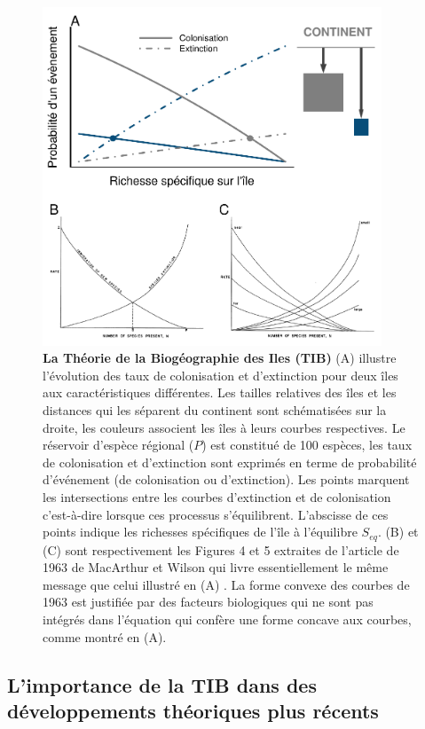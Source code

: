 \begin{figure}
\centering
\includegraphics[width=0.90000\textwidth]{fig/fig1.pdf}
\caption{\textbf{La Théorie de la Biogéographie des Iles (TIB)} (A)
illustre l'évolution des taux de colonisation et d'extinction pour deux
îles aux caractéristiques différentes. Les tailles relatives des îles et
les distances qui les séparent du continent sont schématisées sur la
droite, les couleurs associent les îles à leurs courbes respectives. Le
réservoir d'espèce régional (\(P\)) est constitué de 100 espèces, les
taux de colonisation et d'extinction sont exprimés en terme de
probabilité d'événement (de colonisation ou d'extinction). Les points
marquent les intersections entre les courbes d'extinction et de
colonisation c'est-à-dire lorsque ces processus s'équilibrent.
L'abscisse de ces points indique les richesses spécifiques de l'île à
l'équilibre \(S_{eq}\). (B) et (C) sont respectivement les Figures 4 et
5 extraites de l'article de 1963 de MacArthur et Wilson qui livre
essentiellement le même message que celui illustré en (A)
\citep{MacArthur1963}. La forme convexe des courbes de 1963 est
justifiée par des facteurs biologiques qui ne sont pas intégrés dans
l'équation \label{eqMW} qui confère une forme concave aux courbes, comme
montré en (A).\label{fig:figMW}}
\end{figure}

\subsection*{L'importance de la TIB dans des développements théoriques
plus
récents}\label{limportance-de-la-tib-dans-des-duxe9veloppements-thuxe9oriques-plus-ruxe9cents}

